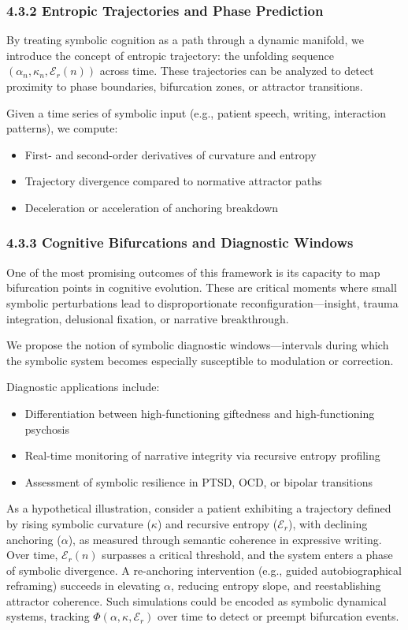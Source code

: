 \subsubsection*{4.3.2 Entropic Trajectories and Phase Prediction}

By treating symbolic cognition as a path through a dynamic manifold, we introduce the concept of entropic trajectory: the unfolding sequence $(\alpha_n, \kappa_n, \mathcal{E}_r(n))$ across time. These trajectories can be analyzed to detect proximity to phase boundaries, bifurcation zones, or attractor transitions.

Given a time series of symbolic input (e.g., patient speech, writing, interaction patterns), we compute:
\begin{itemize}
\item First- and second-order derivatives of curvature and entropy
\item Trajectory divergence compared to normative attractor paths
\item Deceleration or acceleration of anchoring breakdown
\end{itemize}

\subsubsection*{4.3.3 Cognitive Bifurcations and Diagnostic Windows}

One of the most promising outcomes of this framework is its capacity to map bifurcation points in cognitive evolution. These are critical moments where small symbolic perturbations lead to disproportionate reconfiguration—insight, trauma integration, delusional fixation, or narrative breakthrough.

We propose the notion of symbolic diagnostic windows—intervals during which the symbolic system becomes especially susceptible to modulation or correction.

Diagnostic applications include:
\begin{itemize}
\item Differentiation between high-functioning giftedness and high-functioning psychosis
\item Real-time monitoring of narrative integrity via recursive entropy profiling
\item Assessment of symbolic resilience in PTSD, OCD, or bipolar transitions
\end{itemize}

As a hypothetical illustration, consider a patient exhibiting a trajectory defined by rising symbolic curvature ($\kappa$) and recursive entropy ($\mathcal{E}_r$), with declining anchoring ($\alpha$), as measured through semantic coherence in expressive writing. Over time, $\mathcal{E}_r(n)$ surpasses a critical threshold, and the system enters a phase of symbolic divergence. A re-anchoring intervention (e.g., guided autobiographical reframing) succeeds in elevating $\alpha$, reducing entropy slope, and reestablishing attractor coherence. Such simulations could be encoded as symbolic dynamical systems, tracking $\Phi(\alpha, \kappa, \mathcal{E}_r)$ over time to detect or preempt bifurcation events.

